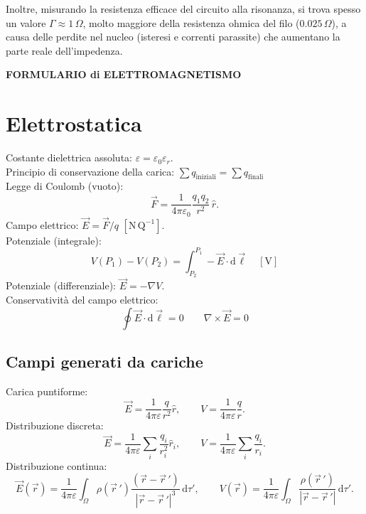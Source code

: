 \documentclass{book}
\begin{document}
Inoltre, misurando la resistenza efficace del circuito alla risonanza, si trova spesso un valore $\Gamma \approx 1 \, \Omega$, molto maggiore della resistenza ohmica del filo ($0.025 \, \Omega$), a causa delle perdite nel nucleo (isteresi e correnti parassite) che aumentano la parte reale dell'impedenza.

\newpage



\begin{center}
  {\LARGE\textbf{FORMULARIO di ELETTROMAGNETISMO}}\\[1ex]
\end{center}

\pagestyle{plain}
\section*{Elettrostatica}

Costante dielettrica assoluta: $\varepsilon=\varepsilon_0\varepsilon_r$.\\
Principio di conservazione della carica: 
$\sum q_{\text{iniziali}} = \sum q_{\text{finali}}$\\
Legge di Coulomb (vuoto):
\[\vec{F}=\dfrac{1}{4\pi\varepsilon_0}\dfrac{q_1 q_2}{r^2}\,\hat{r}.\]
Campo elettrico: $\vec{E}=\vec{F}/q$ $\left[ \mathrm{N\,Q^{-1}} \right]$.  \\
Potenziale (integrale):
\[V(P_1)-V(P_2)=\int_{P_2}^{P_1}-\vec{E}\cdot\mathrm{d}\vec{\ell} \quad \left[ \mathrm{V} \right] \]
Potenziale (differenziale): $\vec{E}=-\nabla V$.\\
Conservativit\`a del campo elettrico: 
\[
\oint\vec{E}\cdot\mathrm{d}\vec{\ell}=0 \qquad \nabla\times\vec{E}=0
\]

\subsection*{Campi generati da cariche}
Carica puntiforme:
\[\vec{E}=\dfrac{1}{4\pi\varepsilon}\dfrac{q}{r^2}\hat{r},\qquad V=\dfrac{1}{4\pi\varepsilon}\dfrac{q}{r}.\]
Distribuzione discreta:
\[\vec{E}=\dfrac{1}{4\pi\varepsilon}\sum_i\dfrac{q_i}{r_i^2}\hat{r}_i,\qquad V=\dfrac{1}{4\pi\varepsilon}\sum_i\dfrac{q_i}{r_i}.\]
Distribuzione continua:
\[\vec{E}(\vec{r})=\dfrac{1}{4\pi\varepsilon}\int_{\Omega} \rho(\vec{r}\,')\frac{(\vec{r}-\vec{r}\,')}{|\vec{r}-\vec{r}\,'|^3}\,\mathrm{d}\tau',\qquad
V(\vec{r})=\dfrac{1}{4\pi\varepsilon}\int_{\Omega}\dfrac{\rho(\vec{r}\,')}{|\vec{r}-\vec{r}\,'|}\,\mathrm{d}\tau'.\]
\end{document}
